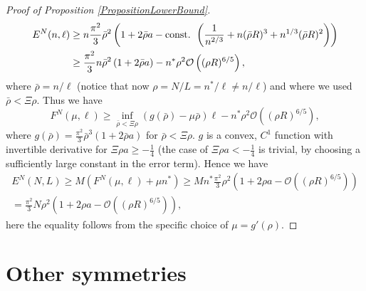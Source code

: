 \documentclass[a4paper,11pt]{article}
\newcommand{\abs}[1]{\left\lvert #1 \right\rvert}
\newcommand{\ie}{\emph{i.e.} }
\numberwithin{equation}{section}
\begin{document}
\begin{proof}[Proof of Proposition \ref{PropositionLowerBound}]
\begin{equation}
			\begin{aligned}
			E^{N}(n,\ell)&\geq n\frac{\pi^2}{3}\bar{\rho}^2\left(1+2\bar{\rho} a-\textnormal{const. }\left(\frac{1}{n^{2/3}}+n(\bar{\rho} R)^3+n^{1/3}(\bar{\rho} R)^2\right)\right)\\
			&\geq \frac{\pi^2}{3}n\bar{\rho}^2\left(1+2\bar{\rho}a\right)-n^*\rho^2\mathcal{O}\left((\rho R)^{6/5}\right),
			\end{aligned}
			\end{equation}
			where $ \bar{\rho}=n/\ell $ (notice that now $ \rho=N/L=n^\ast/\ell\neq n/\ell $) and where we used $ \bar{\rho}<\Xi\rho$.
			Thus we have \begin{equation}
			F^{N}(\mu,\ell)\geq \inf_{\bar{\rho}<\Xi\rho}(g(\bar{\rho})-\mu\bar{\rho})\ell-n^\ast \rho^2 \mathcal{O}\left((\rho R)^{6/5}\right),
			\end{equation}
			where $
			g(\bar{\rho})=
			\frac{\pi^2}{3}\bar{\rho}^3\left(1+2\bar{\rho}a\right)
			$ for $ \bar{\rho}<\Xi\rho $. $ g $ is a convex, $ C^{1} $ function with invertible derivative for $ \Xi\rho a\geq -\frac{1}{4}  $ (the case of $ \Xi\rho a<-\frac{1}{4} $ is trivial, by choosing a sufficiently large constant in the error term). Hence we have \begin{equation}
			\begin{aligned}
			E^{N}(N,L)\geq M(F^{N}(\mu,\ell)+\mu n^*)\geq Mn^\ast\frac{\pi^2}{3} \rho^2 \left(1+2\rho a-\mathcal{O}\left((\rho R)^{6/5}\right)\right)\\
			=\frac{\pi^2}{3} N\rho^2 \left(1+2\rho a-\mathcal{O}\left((\rho R)^{6/5}\right)\right),
			\end{aligned}
			\end{equation}
			here the equality follows from the specific choice of $ \mu=g'(\rho) $.
		\end{proof}
		\section{Other symmetries}
		\label{SectionOtherSymmetries}
\end{document}
